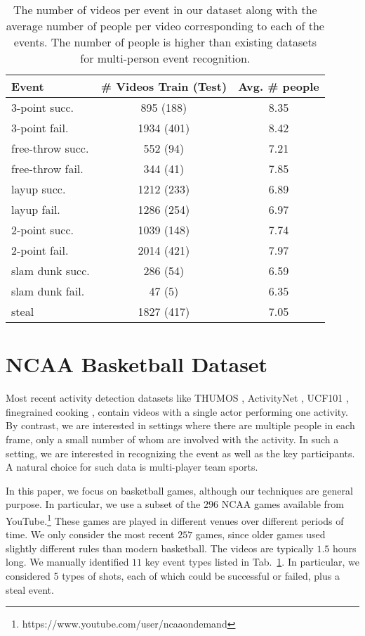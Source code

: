 \begin{table}[ht!]
\begin{center}
\small
 \begin{tabular}{|l|c|c|}
  \hline
  Event          & \# Videos Train (Test) & Avg. \# people \\ \hline \hline
  3-point succ.    & 895 (188) &  8.35 \\ 
  3-point fail.    & 1934 (401) &  8.42 \\ 
  free-throw succ. & 552 (94) &  7.21\\ 
  free-throw fail. & 344 (41) &  7.85\\  
  layup succ.      & 1212 (233) &  6.89\\ 
  layup fail.      & 1286 (254) &  6.97 \\ 
  2-point succ.    & 1039 (148) &  7.74 \\ 
  2-point fail.    & 2014 (421) &  7.97\\ 
  slam dunk succ.  & 286 (54) &  6.59 \\ 
  slam dunk fail.  & 47 (5) &  6.35\\ 
  steal & 1827 (417) & 7.05\\ \hline  
  \end{tabular}
\end{center}
  \caption{The number of videos per event in our dataset along with
  the average number of people per video corresponding to each of the
events. The number of people is higher than existing datasets for
multi-person event recognition.}
  \label{tab:data_dist}
\end{table}



\section{NCAA Basketball Dataset}
\label{sec:data}

Most recent activity detection datasets like THUMOS \cite{THUMOS},
ActivityNet \cite{ActivityNet}, UCF101 
\cite{UCF101}, finegrained cooking \cite{Finegrained_cooking},
contain videos with a single actor performing one activity.
By contrast, we are interested in settings where there are multiple
people in each frame, only a small number of whom are involved with
the  activity. In such a setting, we are interested in recognizing the event
as well as the key participants. A natural choice for such data is
multi-player team sports.

In this paper, we focus on basketball games, although our techniques
are general purpose.
In particular,  we use a subset of the $296$ NCAA games available from 
YouTube.\footnote{https://www.youtube.com/user/ncaaondemand}  These games are
played in different venues over different periods of time.
We only consider the most recent $257$ games, since older games used
slightly different rules than modern basketball.
The videos are typically $1.5$ hours long.
We manually identified $11$ key event types
listed in Tab.~\ref{tab:data_dist}.
In particular, we considered 
5 types of shots, each of which could be successful or failed,
plus a steal event. 

